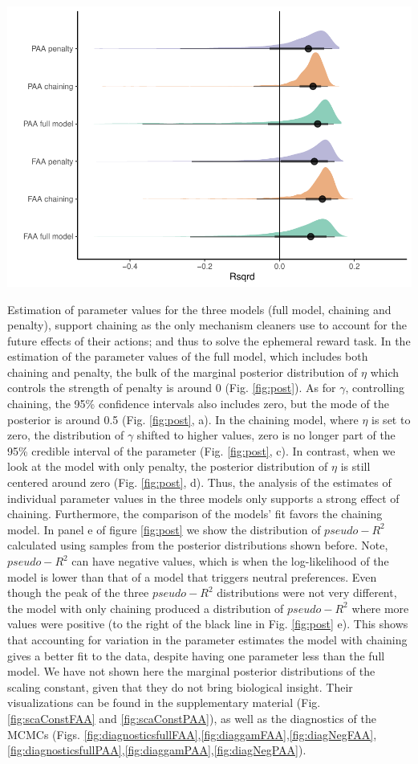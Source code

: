 \documentclass[
  12pt,
]{article}
\begin{document}
\includegraphics{manuscript_BE_files/figure-latex/fitAllModels-1.pdf}

Estimation of parameter values for the three models (full model,
chaining and penalty), support chaining as the only mechanism cleaners
use to account for the future effects of their actions; and thus to
solve the ephemeral reward task. In the estimation of the parameter
values of the full model, which includes both chaining and penalty, the
bulk of the marginal posterior distribution of \(\eta\) which controls
the strength of penalty is around 0 (Fig. \ref{fig:post}). As for
\(\gamma\), controlling chaining, the 95\% confidence intervals also
includes zero, but the mode of the posterior is around 0.5 (Fig.
\ref{fig:post}, a). In the chaining model, where \(\eta\) is set to
zero, the distribution of \(\gamma\) shifted to higher values, zero is
no longer part of the 95\% credible interval of the parameter (Fig.
\ref{fig:post}, c). In contrast, when we look at the model with only
penalty, the posterior distribution of \(\eta\) is still centered around
zero (Fig. \ref{fig:post}, d). Thus, the analysis of the estimates of
individual parameter values in the three models only supports a strong
effect of chaining. Furthermore, the comparison of the models' fit
favors the chaining model. In panel e of figure \ref{fig:post} we show
the distribution of \(pseudo-R^2\) calculated using samples from the
posterior distributions shown before. Note, \(pseudo-R^2\) can have
negative values, which is when the log-likelihood of the model is lower
than that of a model that triggers neutral preferences. Even though the
peak of the three \(pseudo-R^2\) distributions were not very different,
the model with only chaining produced a distribution of \(pseudo-R^2\)
where more values were positive (to the right of the black line in Fig.
\ref{fig:post} e). This shows that accounting for variation in the
parameter estimates the model with chaining gives a better fit to the
data, despite having one parameter less than the full model. We have not
shown here the marginal posterior distributions of the scaling constant,
given that they do not bring biological insight. Their visualizations
can be found in the supplementary material (Fig. \ref{fig:scaConstFAA}
and \ref{fig:scaConstPAA}), as well as the diagnostics of the MCMCs
(Figs.
\ref{fig:diagnosticsfullFAA},\ref{fig:diaggamFAA},\ref{fig:diagNegFAA},
\ref{fig:diagnosticsfullPAA},\ref{fig:diaggamPAA},\ref{fig:diagNegPAA}).
\end{document}
